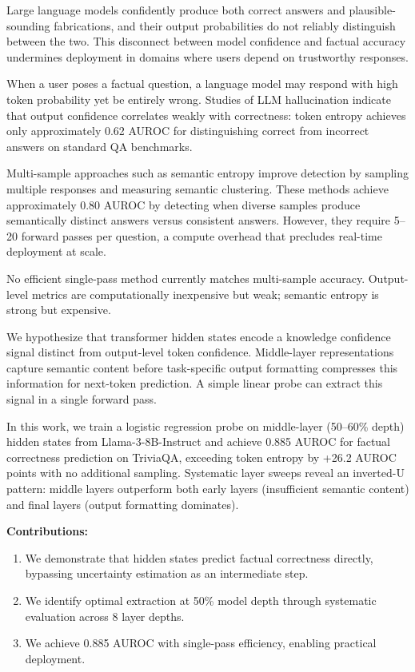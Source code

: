 
Large language models confidently produce both correct answers and plausible-sounding fabrications, and their output probabilities do not reliably distinguish between the two. This disconnect between model confidence and factual accuracy undermines deployment in domains where users depend on trustworthy responses.

When a user poses a factual question, a language model may respond with high token probability yet be entirely wrong. Studies of LLM hallucination indicate that output confidence correlates weakly with correctness: token entropy achieves only approximately 0.62 AUROC for distinguishing correct from incorrect answers on standard QA benchmarks.

Multi-sample approaches such as semantic entropy improve detection by sampling multiple responses and measuring semantic clustering. These methods achieve approximately 0.80 AUROC by detecting when diverse samples produce semantically distinct answers versus consistent answers. However, they require 5--20 forward passes per question, a compute overhead that precludes real-time deployment at scale.

No efficient single-pass method currently matches multi-sample accuracy. Output-level metrics are computationally inexpensive but weak; semantic entropy is strong but expensive.

We hypothesize that transformer hidden states encode a knowledge confidence signal distinct from output-level token confidence. Middle-layer representations capture semantic content before task-specific output formatting compresses this information for next-token prediction. A simple linear probe can extract this signal in a single forward pass.

In this work, we train a logistic regression probe on middle-layer (50--60\% depth) hidden states from Llama-3-8B-Instruct and achieve 0.885 AUROC for factual correctness prediction on TriviaQA, exceeding token entropy by +26.2 AUROC points with no additional sampling. Systematic layer sweeps reveal an inverted-U pattern: middle layers outperform both early layers (insufficient semantic content) and final layers (output formatting dominates).

\textbf{Contributions:}
\begin{enumerate}
\item We demonstrate that hidden states predict factual correctness directly, bypassing uncertainty estimation as an intermediate step.
\item We identify optimal extraction at 50\% model depth through systematic evaluation across 8 layer depths.
\item We achieve 0.885 AUROC with single-pass efficiency, enabling practical deployment.
\end{enumerate}

